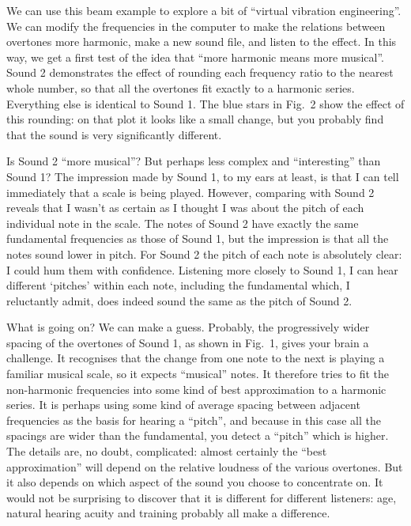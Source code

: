   We can use this beam example to explore a bit of ``virtual vibration 
  engineering''. We can modify the frequencies in the computer to make the 
  relations between overtones more harmonic, make a new sound file, and listen 
  to the effect. In this way, we get a first test of the idea that ``more 
  harmonic means more musical''. Sound 2 demonstrates the effect of rounding 
  each frequency ratio to the nearest whole number, so that all the overtones 
  fit exactly to a harmonic series. Everything else is identical to Sound 1. 
  The blue stars in Fig.\ 2 show the effect of this rounding: on that plot it 
  looks like a small change, but you probably find that the sound is very 
  significantly different. 

  Is Sound 2 ``more musical''? But perhaps less complex and ``interesting'' 
  than Sound 1? The impression made by Sound 1, to my ears at least, is that I 
  can tell immediately that a scale is being played. However, comparing with 
  Sound 2 reveals that I wasn't as certain as I thought I was about the pitch 
  of each individual note in the scale. The notes of Sound 2 have exactly the 
  same fundamental frequencies as those of Sound 1, but the impression is that 
  all the notes sound lower in pitch. For Sound 2 the pitch of each note is 
  absolutely clear: I could hum them with confidence. Listening more closely to 
  Sound 1, I can hear different `pitches' within each note, including the 
  fundamental which, I reluctantly admit, does indeed sound the same as the 
  pitch of Sound 2. 

  What is going on? We can make a guess. Probably, the progressively wider 
  spacing of the overtones of Sound 1, as shown in Fig.\ 1, gives your brain a 
  challenge. It recognises that the change from one note to the next is playing 
  a familiar musical scale, so it expects ``musical'' notes. It therefore tries 
  to fit the non-harmonic frequencies into some kind of best approximation to a 
  harmonic series. It is perhaps using some kind of average spacing between 
  adjacent frequencies as the basis for hearing a ``pitch'', and because in 
  this case all the spacings are wider than the fundamental, you detect a 
  ``pitch'' which is higher. The details are, no doubt, complicated: almost 
  certainly the ``best approximation'' will depend on the relative loudness of 
  the various overtones. But it also depends on which aspect of the sound you 
  choose to concentrate on. It would not be surprising to discover that it is 
  different for different listeners: age, natural hearing acuity and training 
  probably all make a difference. 

